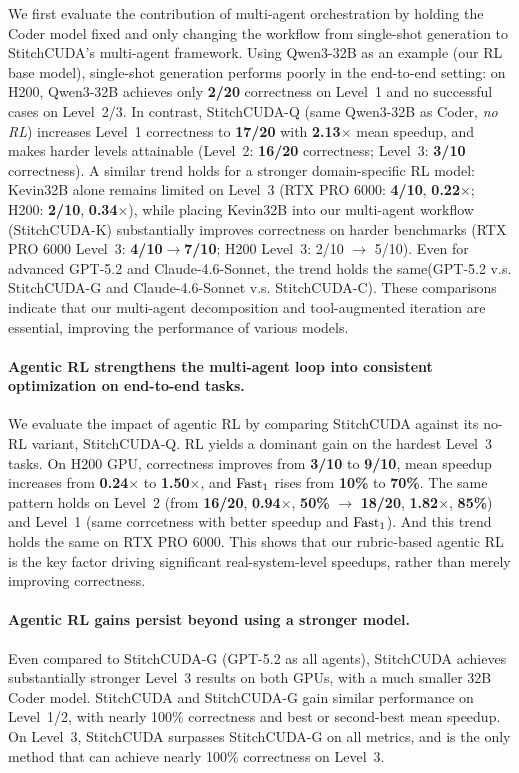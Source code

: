 We first evaluate the contribution of multi-agent orchestration by holding the Coder model fixed and only changing the workflow from single-shot generation to StitchCUDA’s multi-agent framework.
Using Qwen3-32B as an example (our RL base model), single-shot generation performs poorly in the end-to-end setting: on H200, Qwen3-32B achieves only \textbf{2/20} correctness on Level~1 and no successful cases on Level~2/3. In contrast, StitchCUDA-Q (same Qwen3-32B as Coder, \emph{no RL}) increases Level~1 correctness to \textbf{17/20} with \textbf{2.13$\times$} mean speedup, and makes harder levels attainable (Level~2: \textbf{16/20} correctness; Level~3: \textbf{3/10} correctness).
A similar trend holds for a stronger domain-specific RL model: Kevin32B alone remains limited on Level~3 (RTX PRO 6000: \textbf{4/10}, \textbf{0.22$\times$}; H200: \textbf{2/10}, \textbf{0.34$\times$}), while placing Kevin32B into our multi-agent workflow (StitchCUDA-K) substantially improves correctness on harder benchmarks (RTX PRO 6000 Level~3: \textbf{4/10}$\rightarrow$\textbf{7/10};  H200 Level~3: 2/10 $\rightarrow$ 5/10). Even for advanced GPT-5.2 and Claude-4.6-Sonnet, the trend holds the same(GPT-5.2 v.s. StitchCUDA-G and Claude-4.6-Sonnet v.s. StitchCUDA-C).
These comparisons indicate that our multi-agent decomposition and tool-augmented iteration are essential, improving the performance of various models.

\paragraph{Agentic RL strengthens the multi-agent loop into consistent optimization on end-to-end tasks.}
We evaluate the impact of agentic RL by comparing StitchCUDA against its no-RL variant, StitchCUDA-Q. RL yields a dominant gain on the hardest Level~3 tasks. On H200 GPU, correctness improves from \textbf{3/10} to \textbf{9/10}, mean speedup increases from \textbf{0.24$\times$} to \textbf{1.50$\times$}, and $\rm{Fast}_1$ rises from \textbf{10\%} to \textbf{70\%}. The same pattern holds on Level~2 (from \textbf{16/20}, \textbf{0.94$\times$}, \textbf{50\%} $\rightarrow$ \textbf{18/20}, \textbf{1.82$\times$}, \textbf{85\%}) and Level~1 (same corrcetness with better speedup and $\rm{Fast}_1$). And this trend holds the same on RTX PRO 6000. This shows that our rubric-based agentic RL is the key factor driving significant real-system-level speedups, rather than merely improving correctness.
\paragraph{Agentic RL gains persist beyond using a stronger model.}
Even compared to StitchCUDA-G (GPT-5.2 as all agents), StitchCUDA achieves substantially stronger Level~3 results on both GPUs, with a much smaller 32B Coder model. StitchCUDA and StitchCUDA-G gain similar performance on Level~1/2, with nearly 100\% correctness and best or second-best mean speedup. On Level~3, StitchCUDA surpasses StitchCUDA-G on all metrics, and is the only method that can achieve nearly 100\% correctness on Level~3. 



